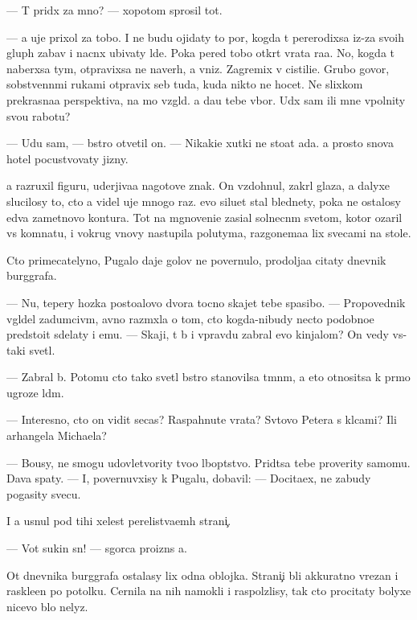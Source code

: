 \documentclass[10pt]{book}
\begin{document}
— T{\yi} prid{\e}x za mno{\y}? — xopotom sprosil tot.

— {\Y}a uje prixol za tobo{\y}. I ne budu ojidaty to{\y} por{\yi}, kogda t{\yi} pererodixsa iz-za svo{\y}ih glup{\yi}h zabav i nacn{\e}x ubivaty l{\iu}de{\y}. Poka pered tobo{\y} otkr{\yi}t{\yi} vrata ra{\y}a. No, kogda t{\yi} naber{\e}xsa tym{\yi}, otpravixsa ne naverh, a vniz. Zagremix v cistili{\x}e. Grubo govor{\ia}, sobstvenn{\yi}mi rukami otpravix seb{\ia} tuda, kuda nikto ne hocet. Ne slixkom prekrasna{\y}a perspektiva, na mo{\y} vzgl{\ia}d. {\Y}a da{\y}u tebe v{\yi}bor. U{\y}d{\e}x sam ili mne v{\yi}polnity svo{\y}u rabotu?

— U{\y}du sam, — b{\yi}stro otvetil on. — Nikaki{\y}e xutki ne sto{\y}at ada. {\Y}a prosto snova hotel pocustvovaty jizny.

{\Y}a razruxil figuru, uderjiva{\y}a nagotove znak. On vzdohnul, zakr{\yi}l glaza, a dalyxe slucilosy to, cto {\y}a videl uje mnogo raz. {\Y}evo siluet stal blednety, poka ne ostalosy {\y}edva zametnovo kontura. Tot na mgnoveni{\y}e zasi{\y}al solnecn{\yi}m svetom, kotor{\yi}{\y} ozaril vs{\iu} komnatu, i vokrug vnovy nastupila polutyma, razgon{\ia}{\y}ema{\y}a lix svecami na stole.

Cto primecatelyno, Pugalo daje golov{\yi} ne povernulo, prodolja{\y}a citaty dnevnik burggrafa.

— Nu, tepery hoz{\ia}{\y}ka posto{\y}alovo dvora tocno skajet tebe spasibo. — Propovednik v{\yi}gl{\ia}del zadumciv{\yi}m, {\y}avno razm{\yi}xl{\ia}{\y}a o tom, cto kogda-nibudy necto podobno{\y}e predsto{\y}it sdelaty i {\y}emu. — Skaji, t{\yi} b{\yi} i vpravdu zabral {\y}evo kinjalom? On vedy vs{\e}-taki svetl{\yi}{\y}.

— Zabral b{\yi}. Potomu cto tako{\y} svetl{\yi}{\y} b{\yi}stro stanovilsa t{\e}mn{\yi}m, a eto otnositsa k pr{\ia}mo{\y} ugroze l{\iu}d{\ia}m.

— Interesno, cto on vidit se{\y}cas? Raspahnut{\yi}{\y}e vrata? Sv{\ia}tovo Petera s kl{\iu}cami? Ili arhangela Michaela?

— Bo{\y}usy, ne smogu udovletvority tvo{\y}o l{\iu}bop{\yi}tstvo. Prid{\e}tsa tebe proverity samomu. Dava{\y} spaty. — I, povernuvxisy k Pugalu, dobavil: — Docita{\y}ex, ne zabudy pogasity svecu.

I {\y}a usnul pod tihi{\y} xelest perelist{\yi}va{\y}em{\yi}h strani{\c}.

— Vot sukin s{\yi}n! — sgor{\ia}ca proizn{\e}s {\y}a.

Ot dnevnika burggrafa ostalasy lix odna oblojka. Strani{\c}i b{\yi}li akkuratno v{\yi}rezan{\yi} i raskle{\y}en{\yi} po potolku. Cernila na nih namokli i raspolzlisy, tak cto procitaty bolyxe nicevo b{\yi}lo nelyz{\ia}.
\end{document}
